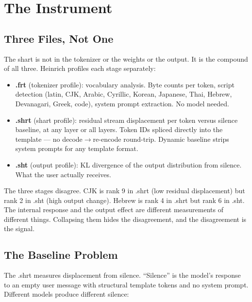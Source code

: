 \documentclass[11pt,a4paper]{article}
\begin{document}
\section{The Instrument}

\subsection{Three Files, Not One}

The shart is not in the tokenizer or the weights or the output. It is the compound of all three. Heinrich profiles each stage separately:

\begin{itemize}[nosep]
\item \textbf{.frt} (tokenizer profile): vocabulary analysis. Byte counts per token, script detection (latin, CJK, Arabic, Cyrillic, Korean, Japanese, Thai, Hebrew, Devanagari, Greek, code), system prompt extraction. No model needed.
\item \textbf{.shrt} (shart profile): residual stream displacement per token versus silence baseline, at any layer or all layers. Token IDs spliced directly into the template --- no decode$\to$re-encode round-trip. Dynamic baseline strips system prompts for any template format.
\item \textbf{.sht} (output profile): KL divergence of the output distribution from silence. What the user actually receives.
\end{itemize}

The three stages disagree. CJK is rank 9 in .shrt (low residual displacement) but rank 2 in .sht (high output change). Hebrew is rank 4 in .shrt but rank 6 in .sht. The internal response and the output effect are different measurements of different things. Collapsing them hides the disagreement, and the disagreement is the signal.

\subsection{The Baseline Problem}

The .shrt measures displacement from silence. ``Silence'' is the model's response to an empty user message with structural template tokens and no system prompt. Different models produce different silence:
\end{document}
